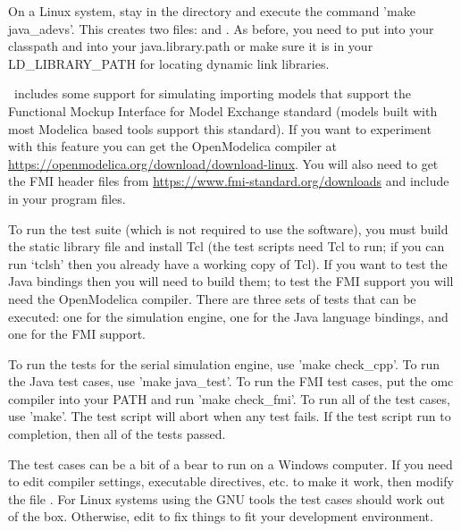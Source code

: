 On a Linux system, stay in the  directory and execute the command 'make java\_adevs'. This creates two files:  and . As before, you need to put  into your classpath and  into your java.library.path or make sure it is in your LD\_LIBRARY\_PATH for locating dynamic link libraries.

\adevs\ includes some support for simulating importing models that support the Functional Mockup Interface for Model Exchange standard (models built with most Modelica based tools support this standard). If you want to experiment with this feature you can get the OpenModelica compiler at \url{https://openmodelica.org/download/download-linux}. You will also need to get the FMI header files from \url{https://www.fmi-standard.org/downloads} and include  in your program files.

To run the test suite (which is not required to use the software), you must build the static library file and install Tcl (the test scripts need Tcl to run; if you can run `tclsh' then you already have a working copy of Tcl). If you want to test the Java bindings then you will need to build them; to test the FMI support you will need the OpenModelica compiler. There are three sets of tests that can be executed: one for the simulation engine, one for the Java language bindings, and one for the FMI support.

To run the tests for the serial simulation engine, use 'make check\_cpp'. To run the Java test cases, use 'make java\_test'. To run the FMI test cases, put the omc compiler into your PATH and run 'make check\_fmi'. To run all of the test cases, use 'make'. The test script will abort when any test fails. If the test script run to completion, then all of the tests passed.

The test cases can be a bit of a bear to run on a Windows computer. If you need to edit compiler settings, executable directives, etc. to make it work, then modify the file . For Linux systems using the GNU tools the test cases should work out of the box. Otherwise, edit  to fix things to fit your development environment.
